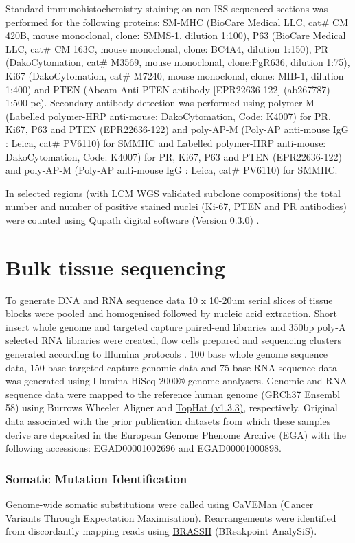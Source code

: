 Standard immunohistochemistry staining on non-\ac{ISS} sequenced sections was performed for the following proteins: SM-MHC (BioCare Medical LLC, cat\# CM 420B, mouse monoclonal, clone: SMMS-1, dilution 1:100), P63 (BioCare Medical LLC, cat\# CM 163C, mouse monoclonal, clone: BC4A4, dilution 1:150), PR (DakoCytomation, cat\# M3569, mouse monoclonal, clone:PgR636, dilution 1:75), Ki67 (DakoCytomation, cat\# M7240, mouse monoclonal, clone: MIB-1, dilution 1:400) and PTEN (Abcam Anti-PTEN antibody [EPR22636-122] (ab267787) 1:500 pc). Secondary antibody detection was performed using polymer-M (Labelled polymer-HRP anti-mouse: DakoCytomation, Code: K4007) for PR, Ki67, P63 and PTEN (EPR22636-122) and poly-AP-M (Poly-AP anti-mouse IgG : Leica, cat\# PV6110) for SMMHC and Labelled polymer-HRP anti-mouse: DakoCytomation, Code: K4007) for PR, Ki67, P63 and PTEN (EPR22636-122) and poly-AP-M (Poly-AP anti-mouse IgG : Leica, cat\# PV6110) for SMMHC.

In selected regions (with LCM WGS validated subclone compositions) the total number and number of positive stained nuclei (Ki-67, PTEN and PR antibodies) were counted using Qupath digital software (Version 0.3.0) \parencite{Bankhead2017-px}.

\section{Bulk tissue sequencing}
\label{sec:protocol-suppl-bulk-seq}

To generate DNA and RNA sequence data 10 x 10-20um serial slices of tissue blocks were pooled and homogenised followed by nucleic acid extraction. Short insert whole genome and targeted capture paired-end libraries and 350bp poly-A selected RNA libraries were created, flow cells prepared and sequencing clusters generated according to Illumina protocols \parencite{Kozarewa2009-yj}. 100 base whole genome sequence data, 150 base targeted capture genomic data and 75 base RNA sequence data was generated using Illumina HiSeq 2000® genome analysers. Genomic and RNA sequence data were mapped to the reference human genome (GRCh37 Ensembl 58) using Burrows Wheeler Aligner \parencite{Li2009-aq} and \href{http://ccb.jhu.edu/software/tophat/index.shtml}{TopHat (v1.3.3)}, respectively. Original data associated with the prior publication datasets from which these samples derive are deposited in the European Genome Phenome Archive (EGA) with the following accessions: EGAD00001002696 and EGAD00001000898.

\subsubsection*{Somatic Mutation Identification}
Genome-wide somatic substitutions were called using \href{http://cancerit.github.io/CaVEMan/}{CaVEMan} (Cancer Variants Through Expectation Maximisation). Rearrangements were identified from discordantly mapping reads using \href{https://github.com/cancerit/BRASS}{BRASSII} (BReakpoint AnalySiS). 

